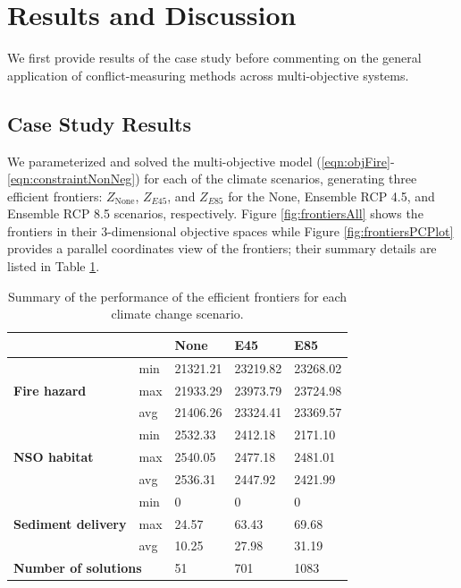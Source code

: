 \section{Results and Discussion}
\label{sec:results}
We first provide results of the case study before commenting on the general application of conflict-measuring methods across multi-objective systems.

\subsection{Case Study Results}
We parameterized and solved the multi-objective model (\eqref{eqn:objFire}-\eqref{eqn:constraintNonNeg}) for each of the climate scenarios, generating three efficient frontiers: $Z_{\text{None}}$, $Z_{E45}$, and $Z_{E85}$ for the None, Ensemble RCP 4.5, and Ensemble RCP 8.5 scenarios, respectively. Figure \ref{fig:frontiersAll} shows the frontiers in their 3-dimensional objective spaces while Figure \ref{fig:frontiersPCPlot} provides a parallel coordinates view of the frontiers; their summary details are listed in Table \ref{tab:frontiersSummary}.

\begin{table}[]
\centering
\caption[Summary of efficient frontiers]{Summary of the performance of the efficient frontiers for each climate change scenario.}
\label{tab:frontiersSummary}
\begin{tabular}{lllll}
\multicolumn{2}{l|}{}                                                  & \textbf{None} & \textbf{E45} & \textbf{E85} \\ \hline
\multirow{3}{*}{\textbf{Fire hazard}}       & \multicolumn{1}{l|}{min} & 21321.21      & 23219.82     & 23268.02     \\
                                            & \multicolumn{1}{l|}{max} & 21933.29      & 23973.79     & 23724.98     \\
                                            & \multicolumn{1}{l|}{avg} & 21406.26      & 23324.41     & 23369.57     \\ \hline
\multirow{3}{*}{\textbf{NSO habitat}}       & \multicolumn{1}{l|}{min} & 2532.33       & 2412.18      & 2171.10      \\
                                            & \multicolumn{1}{l|}{max} & 2540.05       & 2477.18      & 2481.01      \\
                                            & \multicolumn{1}{l|}{avg} & 2536.31       & 2447.92      & 2421.99      \\ \hline
\multirow{3}{*}{\textbf{Sediment delivery}} & \multicolumn{1}{l|}{min} & 0             & 0            & 0            \\
                                            & \multicolumn{1}{l|}{max} & 24.57         & 63.43        & 69.68        \\
                                            & \multicolumn{1}{l|}{avg} & 10.25         & 27.98        & 31.19        \\ \hline
\multicolumn{2}{l}{\textbf{Number of solutions}}                       & 51            & 701          & 1083        
\end{tabular}
\end{table}


